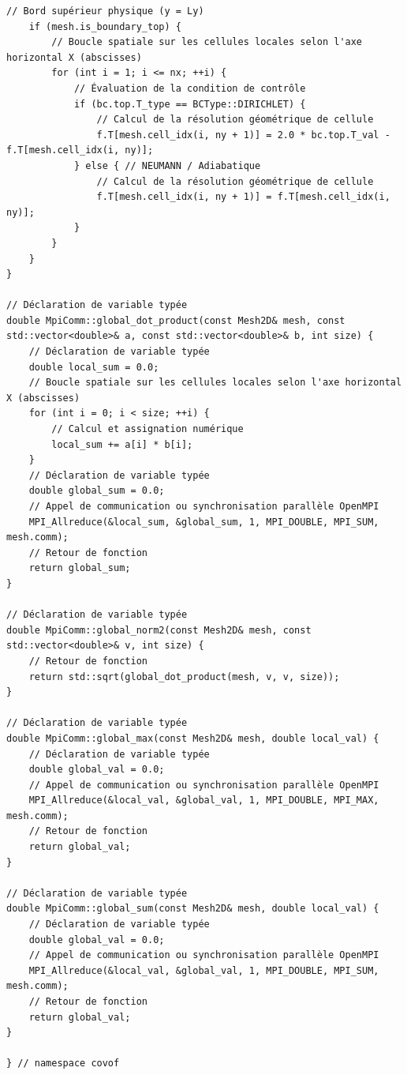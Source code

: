 \documentclass[10pt,a4paper,oneside]{book}
\begin{document}
\begin{lstlisting}[language={[11]C++}]
    // Bord supérieur physique (y = Ly)
    if (mesh.is_boundary_top) {
        // Boucle spatiale sur les cellules locales selon l'axe horizontal X (abscisses)
        for (int i = 1; i <= nx; ++i) {
            // Évaluation de la condition de contrôle
            if (bc.top.T_type == BCType::DIRICHLET) {
                // Calcul de la résolution géométrique de cellule
                f.T[mesh.cell_idx(i, ny + 1)] = 2.0 * bc.top.T_val - f.T[mesh.cell_idx(i, ny)];
            } else { // NEUMANN / Adiabatique
                // Calcul de la résolution géométrique de cellule
                f.T[mesh.cell_idx(i, ny + 1)] = f.T[mesh.cell_idx(i, ny)];
            }
        }
    }
}

// Déclaration de variable typée
double MpiComm::global_dot_product(const Mesh2D& mesh, const std::vector<double>& a, const std::vector<double>& b, int size) {
    // Déclaration de variable typée
    double local_sum = 0.0;
    // Boucle spatiale sur les cellules locales selon l'axe horizontal X (abscisses)
    for (int i = 0; i < size; ++i) {
        // Calcul et assignation numérique
        local_sum += a[i] * b[i];
    }
    // Déclaration de variable typée
    double global_sum = 0.0;
    // Appel de communication ou synchronisation parallèle OpenMPI
    MPI_Allreduce(&local_sum, &global_sum, 1, MPI_DOUBLE, MPI_SUM, mesh.comm);
    // Retour de fonction
    return global_sum;
}

// Déclaration de variable typée
double MpiComm::global_norm2(const Mesh2D& mesh, const std::vector<double>& v, int size) {
    // Retour de fonction
    return std::sqrt(global_dot_product(mesh, v, v, size));
}

// Déclaration de variable typée
double MpiComm::global_max(const Mesh2D& mesh, double local_val) {
    // Déclaration de variable typée
    double global_val = 0.0;
    // Appel de communication ou synchronisation parallèle OpenMPI
    MPI_Allreduce(&local_val, &global_val, 1, MPI_DOUBLE, MPI_MAX, mesh.comm);
    // Retour de fonction
    return global_val;
}

// Déclaration de variable typée
double MpiComm::global_sum(const Mesh2D& mesh, double local_val) {
    // Déclaration de variable typée
    double global_val = 0.0;
    // Appel de communication ou synchronisation parallèle OpenMPI
    MPI_Allreduce(&local_val, &global_val, 1, MPI_DOUBLE, MPI_SUM, mesh.comm);
    // Retour de fonction
    return global_val;
}

} // namespace covof

\end{lstlisting}
\end{document}
